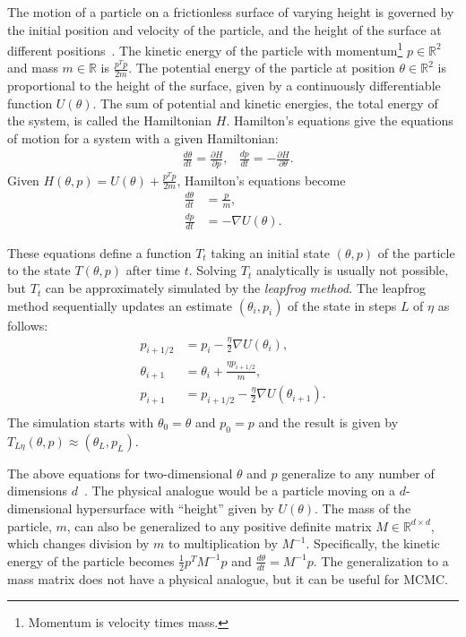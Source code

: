 \documentclass[english,twoside,openright]{HYgraduMLDS}
\newcommand{\R}{\mathbb{R}}
\begin{document}
The motion of a particle on a frictionless surface of varying height is governed 
by the initial position and velocity of the particle, and the height of the 
surface at different positions~\cite{neal2012mcmc}. 
The kinetic energy of the particle with 
momentum\footnote{Momentum is velocity times mass.}
\(p \in \R^{2}\) and mass \(m \in \R\) is \(\frac{p^{T}p}{2m}\). The potential energy of the particle
at position \(\theta \in \R^{2}\) is proportional to the height of the surface, given by
a continuously differentiable function \(U(\theta)\). 
The sum of potential and kinetic energies, the total 
energy of the system, is called the Hamiltonian \(H\). Hamilton's equations 
give the equations of motion for a system with a given Hamiltonian:
\begin{align*}
    &\frac{d\theta}{dt} = \frac{\partial H}{\partial p},
    &\frac{dp}{dt} = -\frac{\partial H}{\partial \theta}.
\end{align*}
Given \(H(\theta, p) = U(\theta) + \frac{p^{T}p}{2m}\), Hamilton's equations become
\begin{align*}
    \frac{d\theta}{dt} &= \frac{p}{m}, \\
    \frac{dp}{dt} &= -\nabla U(\theta).
\end{align*}

These equations define a function \(T_t\) taking an initial state 
\((\theta, p)\) of the particle to the state \(T(\theta, p)\) after time \(t\).
Solving \(T_t\) analytically is usually not possible, but \(T_t\) can be 
approximately simulated by the \emph{leapfrog method}. The leapfrog method sequentially
updates an estimate \((\theta_i, p_i)\) of the state in steps \(L\) of \(\eta\) 
as follows:
\begin{align*}
    p_{i+1/2} &= p_i - \frac{\eta}{2}\nabla U(\theta_i), \\
    \theta_{i+1} &= \theta_i + \frac{\eta p_{i+1/2}}{m}, \\
    p_{i+1} &= p_{i+1/2} - \frac{\eta}{2}\nabla U(\theta_{i+1}). \\
\end{align*}
The simulation starts with \(\theta_0 = \theta\) and \(p_0 = p\) and the 
result is given by \(T_{L\eta}(\theta, p) \approx (\theta_L, p_L)\).

The above equations for two-dimensional \(\theta\) and \(p\) generalize to
any number of dimensions \(d\)~\cite{neal2012mcmc}. The physical analogue would be a particle moving
on a \(d\)-dimensional hypersurface with ``height'' given by \(U(\theta)\).
The mass of the particle, \(m\), can also be generalized to any positive
definite matrix \(M \in \R^{d\times d}\), which changes division by
\(m\) to multiplication by \(M^{-1}\). Specifically, the kinetic energy of the
particle becomes \(\frac{1}{2}p^{T}M^{-1}p\) and
\(\frac{d\theta}{dt} = M^{-1}p\). The generalization to a mass matrix does not
have a physical analogue, but it can be useful for MCMC.
\end{document}
